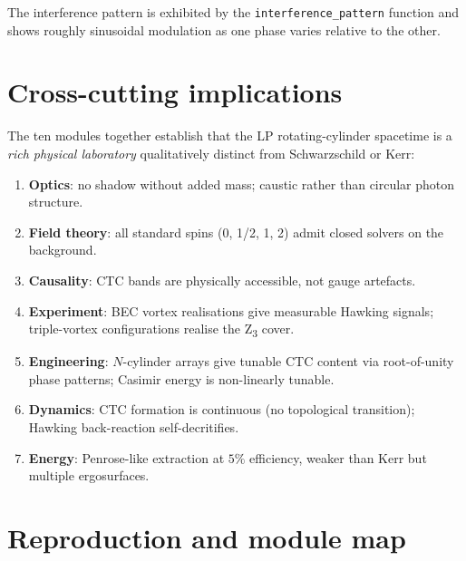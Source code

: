 \documentclass[11pt,a4paper]{article}
\begin{document}
The interference pattern is exhibited by the
\texttt{interference\_pattern} function and shows roughly sinusoidal
modulation as one phase varies relative to the other.

\section{Cross-cutting implications}

The ten modules together establish that the LP rotating-cylinder
spacetime is a \emph{rich physical laboratory} qualitatively
distinct from Schwarzschild or Kerr:

\begin{enumerate}
\item \textbf{Optics}: no shadow without added mass; caustic rather
than circular photon structure.
\item \textbf{Field theory}: all standard spins (0, 1/2, 1, 2)
admit closed solvers on the background.
\item \textbf{Causality}: CTC bands are physically accessible, not
gauge artefacts.
\item \textbf{Experiment}: BEC vortex realisations give measurable
Hawking signals; triple-vortex configurations realise the
Z\textsubscript{3} cover.
\item \textbf{Engineering}: $N$-cylinder arrays give tunable CTC
content via root-of-unity phase patterns; Casimir energy is
non-linearly tunable.
\item \textbf{Dynamics}: CTC formation is continuous (no
topological transition); Hawking back-reaction self-decritifies.
\item \textbf{Energy}: Penrose-like extraction at $5\%$ efficiency,
weaker than Kerr but multiple ergosurfaces.
\end{enumerate}

\section{Reproduction and module map}
\end{document}
